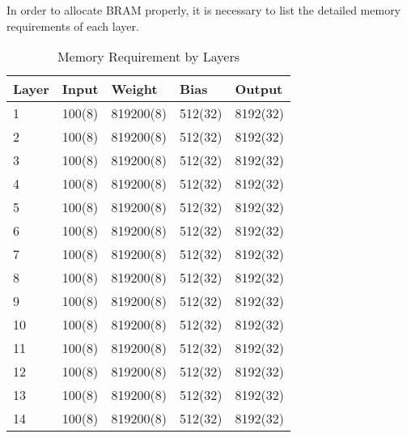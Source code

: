 In order to allocate BRAM properly, it is necessary to list the detailed memory requirements of each layer.

\begin{table}[h]
  \centering
  \caption{Memory Requirement by Layers}
  \begin{tabular}{l | l | l | l | l}
    \toprule
    Layer & Input & Weight & Bias & Output \\
    \midrule
    1 & 100(8) & 819200(8) & 512(32) & 8192(32) \\
    2 & 100(8) & 819200(8) & 512(32) & 8192(32) \\
    3 & 100(8) & 819200(8) & 512(32) & 8192(32) \\
    4 & 100(8) & 819200(8) & 512(32) & 8192(32) \\
    5 & 100(8) & 819200(8) & 512(32) & 8192(32) \\
    6 & 100(8) & 819200(8) & 512(32) & 8192(32) \\
    7 & 100(8) & 819200(8) & 512(32) & 8192(32) \\
    8 & 100(8) & 819200(8) & 512(32) & 8192(32) \\
    9 & 100(8) & 819200(8) & 512(32) & 8192(32) \\
    10 & 100(8) & 819200(8) & 512(32) & 8192(32) \\
    11 & 100(8) & 819200(8) & 512(32) & 8192(32) \\
    12 & 100(8) & 819200(8) & 512(32) & 8192(32) \\
    13 & 100(8) & 819200(8) & 512(32) & 8192(32) \\
    14 & 100(8) & 819200(8) & 512(32) & 8192(32) \\
    \bottomrule
  \end{tabular}
  \label{table:memory_requirements}
\end{table}

\clearpage %
